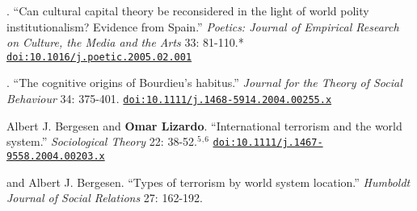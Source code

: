 
.  ``Can cultural capital theory be reconsidered in the light of world polity institutionalism? Evidence from Spain.'' {\em Poetics:  Journal of Empirical Research on Culture, the Media and the Arts} 33: 81-110.\textcolor{uclablue}{*} \href{https://doi.org/10.1016/j.poetic.2005.02.001}{\nolinkurl{doi:10.1016/j.poetic.2005.02.001}} 

. ``The cognitive origins of Bourdieu's habitus.'' {\em Journal for the Theory of Social Behaviour} 34: 375-401. \href{https://doi.org/10.1111/j.1468-5914.2004.00255.x}{\nolinkurl{doi:10.1111/j.1468-5914.2004.00255.x}}

\ind Albert J. Bergesen and {\bf Omar Lizardo}. ``International terrorism and the world system.'' {\em Sociological Theory} 22: 38-52.\textcolor{uclablue}{$^{5}$}$^{,}$\textcolor{uclablue}{$^{6}$} \href{https://doi.org/10.1111/j.1467-9558.2004.00203.x}{\nolinkurl{doi:10.1111/j.1467-9558.2004.00203.x}}

 and Albert J. Bergesen. ``Types of terrorism by world system location.'' {\em Humboldt Journal of Social Relations} 27: 162-192.  